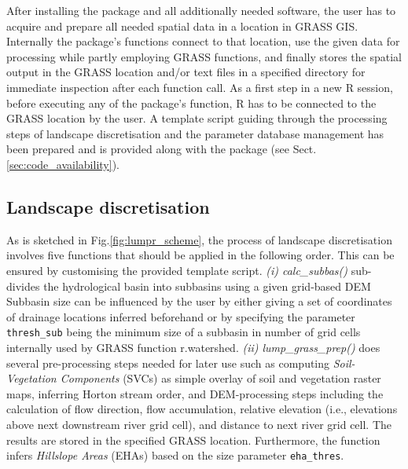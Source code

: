 After installing the package and all additionally needed software, the user has to acquire and prepare all needed spatial data in a location in GRASS GIS.
Internally the package's functions connect to that location, use the given data for processing while partly employing GRASS functions, and finally stores the spatial output in the GRASS location and/or text files in a specified directory for immediate inspection after each function call.
As a first step in a new R session, before executing any of the package's function, R has to be connected to the GRASS location by the user.
A template script guiding through the processing steps of landscape discretisation and the parameter database management has been prepared and is provided along with the package (see Sect.\DIFaddbegin \DIFadd{\ }\DIFaddend \ref{sec:code_availability}).


\subsection{Landscape discretisation}
\label{sec:landscape_discretisation}
As is sketched in Fig.\DIFaddbegin \DIFadd{\ }\DIFaddend \ref{fig:lumpr_scheme}, the process of landscape discretisation involves five functions that should be applied in the following order.
This can be ensured by customising the provided template script.
\DIFaddbegin {}\DIFaddend \emph{(i) calc\_subbas()} sub-divides the hydrological basin into subbasins using a given grid-based DEM \DIFdelbegin {}\DIFdelend \DIFaddbegin {}\DIFaddend Subbasin size can be influenced by the user by either giving a set of coordinates of drainage locations inferred beforehand or by specifying the parameter \verb|thresh_sub| being the minimum size of a subbasin in number of grid cells internally used by GRASS function r.watershed.
\DIFaddbegin {}\DIFaddend \emph{(ii) lump\_grass\_prep()} does several pre-processing steps needed for later use such as computing \emph{Soil-Vegetation Components} (SVCs) as simple overlay of soil and vegetation raster maps, inferring Horton stream order, and DEM-processing steps including the calculation of flow direction, flow accumulation, relative elevation (i.e., elevations above next downstream river grid cell), and distance to next river grid cell.
The results are stored in the specified GRASS location.
Furthermore, the function infers \emph{\DIFdelbegin {}\DIFdelend \DIFaddbegin {}\DIFaddend Hillslope Areas} (EHAs) based on the size parameter \verb|eha_thres|.
\DIFaddbegin {}\DIFaddend 

